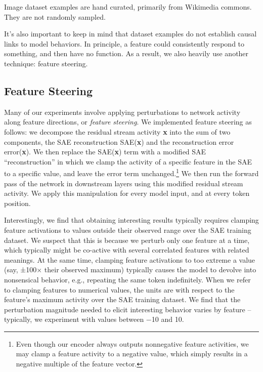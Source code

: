 \documentclass{article}
\let\oldsubsection\subsection
\renewcommand{\subsection}{\FloatBarrier\oldsubsection}
\begin{document}
Image dataset examples are hand curated, primarily from Wikimedia commons. They are not randomly sampled.

It's also important to keep in mind that dataset examples do not establish causal links to model behaviors. In principle, a feature could consistently respond to something, and then have no function. As a result, we also heavily use another technique: feature steering.

\subsection{Feature Steering}\label{sec:appendix-methods-steering}

Many of our experiments involve applying perturbations to network activity along feature directions, or \textit{feature steering}. We implemented feature steering as follows: we decompose the residual stream activity \textbf{x} into the sum of two components, the SAE reconstruction SAE(\textbf{x}) and the reconstruction error error(\textbf{x}). We then replace the SAE(\textbf{x}) term with a modified SAE “reconstruction” in which we clamp the activity of a specific feature in the SAE to a specific value, and leave the error term unchanged.\footnote{Even though our encoder always outputs nonnegative feature activities, we may clamp a feature activity to a negative value, which simply results in a negative multiple of the feature vector.} We then run the forward pass of the network in downstream layers using this modified residual stream activity. We apply this manipulation for every model input, and at every token position.

Interestingly, we find that obtaining interesting results typically requires clamping feature activations to values outside their observed range over the SAE training dataset. We suspect that this is because we perturb only one feature at a time, which typically might be co-active with several correlated features with related meanings. At the same time, clamping feature activations to too extreme a value (say, ±100× their observed maximum) typically causes the model to devolve into nonsensical behavior, e.g., repeating the same token indefinitely. When we refer to clamping features to numerical values, the units are with respect to the feature’s maximum activity over the SAE training dataset. We find that the perturbation magnitude needed to elicit interesting behavior varies by feature -- typically, we experiment with values between −10 and 10.
\end{document}
